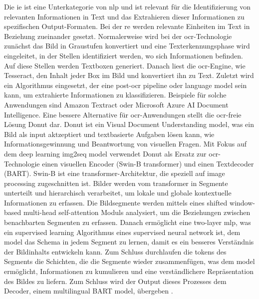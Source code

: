 Die \gls{ie} ist eine Unterkategorie von \gls{nlp} und ist relevant für die Identifizierung von relevanten Informationen in Text und das Extrahieren dieser Informationen zu spezifischen Output-Formaten. Bei der \gls{re} werden relevante Einheiten im Text in Beziehung zueinander gesetzt. Normalerweise wird bei der \gls{ocr}-Technologie zunächst das Bild in Graustufen konvertiert und eine Texterkennungsphase wird eingeleitet, in der Stellen identifiziert werden, wo sich Informationen befinden. Auf diese Stellen werden Textboxen generiert. Danach liest die \gls{ocr}-Engine, wie Tesseract, den Inhalt jeder Box im Bild und konvertiert ihn zu Text. Zuletzt wird ein Algorithmus eingesetzt, der eine post-\gls{ocr} pipeline oder language model sein kann, um extrahierte Informationen zu klassifizieren. Beispiele für solche Anwendungen sind Amazon Textract oder Microsoft Azure AI Document Intelligence. Eine bessere Alternative für \gls{ocr}-Anwendungen stellt die \gls{ocr}-freie Lösung Donut dar. Donut ist ein Visual Document Understanding model, was ein Bild als input aktzeptiert und textbasierte Aufgaben lösen kann, wie Informationsgewinnung und Beantwortung von visuellen Fragen. Mit Fokus auf dem deep learning img2seq model verwendet Donut als Ersatz zur \gls{ocr}-Technologie einen visuellen Encoder (Swin-B transformer) und einen Textdecoder (BART). Swin-B ist eine transformer-Architektur, die speziell auf image processing zugeschnitten ist. Bilder werden vom transformer in Segmente unterteilt und hierarchisch verarbeitet, um lokale und globale kontextuelle Informationen zu erfassen. Die Bildsegmente werden mittels eines shifted window-based multi-head self-attention Moduls analysiert, um die Beziehungen zwischen benachbarten Segmenten zu erfassen. Danach ermöglicht eine two-layer \gls{mlp}, was ein supervised learning Algorithmus eines supervised neural network ist, dem model das Schema in jedem Segment zu lernen, damit es ein besseres Verständnis der Bildinhalts entwickeln kann. Zum Schluss durchlaufen die tokens des Segments die Schichten, die die Segmente wieder zusammenfügen, was dem model ermöglicht, Informationen zu kumulieren und eine verständlichere Repräsentation des Bildes zu liefern. Zum Schluss wird der Output dieses Prozesses dem Decoder, einem multilingual BART model, übergeben \cite{transformers-ocr}. \\
